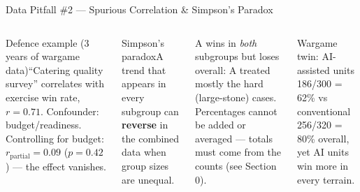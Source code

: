 \documentclass[aspectratio=169,10pt,t]{beamer}
\begin{document}
\begin{frame}{Data Pitfall \#2 --- Spurious Correlation \& Simpson's Paradox}
\begin{columns}[T]
\begin{cbox}[ISSAred]{Defence example (3 years of wargame data)}\scriptsize ``Catering quality survey'' correlates with exercise win rate, $r=0.71$. Confounder: budget/readiness. Controlling for budget: $r_{\text{partial}}=0.09$ ($p=0.42$) --- the effect vanishes.\end{cbox}
\begin{cbox}[ISSAnavy]{Simpson's paradox}\scriptsize A trend that appears in every subgroup can \textbf{reverse} in the combined data when group sizes are unequal.\end{cbox}
\begin{ibox}\scriptsize A wins in \emph{both} subgroups but loses overall: A treated mostly the hard (large-stone) cases. Percentages cannot be added or averaged --- totals must come from the counts (see Section 0).\end{ibox}
\begin{rbox}\scriptsize Wargame twin: AI-assisted units 186/300 = 62\% vs conventional 256/320 = 80\% overall, yet AI units win more in every terrain.\end{rbox}
\end{columns}
\end{frame}
\end{document}
